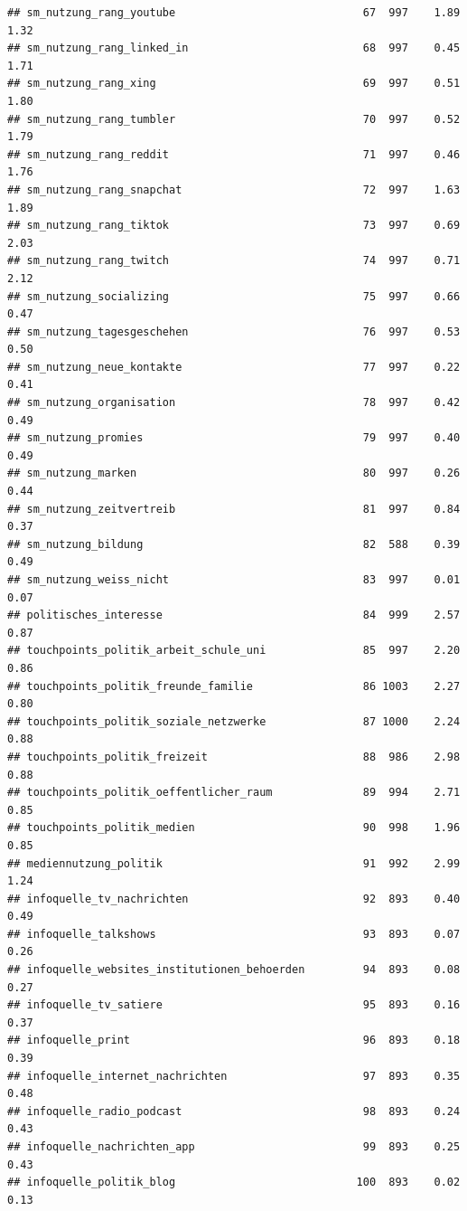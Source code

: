 \documentclass[
]{book}
\begin{document}
\begin{verbatim}
## sm_nutzung_rang_youtube                             67  997    1.89   1.32
## sm_nutzung_rang_linked_in                           68  997    0.45   1.71
## sm_nutzung_rang_xing                                69  997    0.51   1.80
## sm_nutzung_rang_tumbler                             70  997    0.52   1.79
## sm_nutzung_rang_reddit                              71  997    0.46   1.76
## sm_nutzung_rang_snapchat                            72  997    1.63   1.89
## sm_nutzung_rang_tiktok                              73  997    0.69   2.03
## sm_nutzung_rang_twitch                              74  997    0.71   2.12
## sm_nutzung_socializing                              75  997    0.66   0.47
## sm_nutzung_tagesgeschehen                           76  997    0.53   0.50
## sm_nutzung_neue_kontakte                            77  997    0.22   0.41
## sm_nutzung_organisation                             78  997    0.42   0.49
## sm_nutzung_promies                                  79  997    0.40   0.49
## sm_nutzung_marken                                   80  997    0.26   0.44
## sm_nutzung_zeitvertreib                             81  997    0.84   0.37
## sm_nutzung_bildung                                  82  588    0.39   0.49
## sm_nutzung_weiss_nicht                              83  997    0.01   0.07
## politisches_interesse                               84  999    2.57   0.87
## touchpoints_politik_arbeit_schule_uni               85  997    2.20   0.86
## touchpoints_politik_freunde_familie                 86 1003    2.27   0.80
## touchpoints_politik_soziale_netzwerke               87 1000    2.24   0.88
## touchpoints_politik_freizeit                        88  986    2.98   0.88
## touchpoints_politik_oeffentlicher_raum              89  994    2.71   0.85
## touchpoints_politik_medien                          90  998    1.96   0.85
## mediennutzung_politik                               91  992    2.99   1.24
## infoquelle_tv_nachrichten                           92  893    0.40   0.49
## infoquelle_talkshows                                93  893    0.07   0.26
## infoquelle_websites_institutionen_behoerden         94  893    0.08   0.27
## infoquelle_tv_satiere                               95  893    0.16   0.37
## infoquelle_print                                    96  893    0.18   0.39
## infoquelle_internet_nachrichten                     97  893    0.35   0.48
## infoquelle_radio_podcast                            98  893    0.24   0.43
## infoquelle_nachrichten_app                          99  893    0.25   0.43
## infoquelle_politik_blog                            100  893    0.02   0.13

\end{verbatim}
\end{document}
